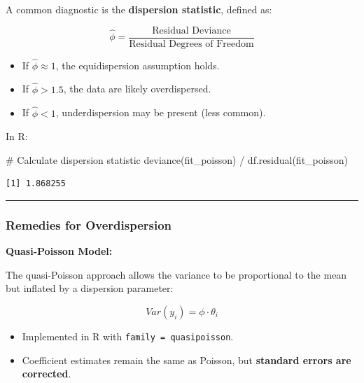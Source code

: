 \documentclass[
  letterpaper,
  DIV=11,
  numbers=noendperiod]{scrreprt}
\newenvironment{Shaded}{\begin{snugshade}}{\end{snugshade}}
\newcommand{\CommentTok}[1]{\textcolor[rgb]{0.37,0.37,0.37}{#1}}
\newcommand{\FunctionTok}[1]{\textcolor[rgb]{0.28,0.35,0.67}{#1}}
\newcommand{\NormalTok}[1]{\textcolor[rgb]{0.00,0.23,0.31}{#1}}
\newcommand{\SpecialCharTok}[1]{\textcolor[rgb]{0.37,0.37,0.37}{#1}}
\providecommand{\tightlist}{%
  \setlength{\itemsep}{0pt}\setlength{\parskip}{0pt}}\usepackage{longtable,booktabs,array}
\begin{document}
A common diagnostic is the \textbf{dispersion statistic}, defined as:

\[
\hat{\phi} = \frac{\text{Residual Deviance}}{\text{Residual Degrees of Freedom}}
\]

\begin{itemize}
\tightlist
\item
  If \(\hat{\phi} \approx 1\), the equidispersion assumption holds.\\
\item
  If \(\hat{\phi} > 1.5\), the data are likely overdispersed.\\
\item
  If \(\hat{\phi} < 1\), underdispersion may be present (less common).
\end{itemize}

In R:

\begin{Shaded}
\begin{Highlighting}[]
\CommentTok{\# Calculate dispersion statistic}
\FunctionTok{deviance}\NormalTok{(fit\_poisson) }\SpecialCharTok{/} \FunctionTok{df.residual}\NormalTok{(fit\_poisson)}
\end{Highlighting}
\end{Shaded}

\begin{verbatim}
[1] 1.868255
\end{verbatim}

\begin{center}\rule{0.5\linewidth}{0.5pt}\end{center}

\hypertarget{remedies-for-overdispersion}{%
\subsubsection*{Remedies for
Overdispersion}\label{remedies-for-overdispersion}}

\textbf{Quasi-Poisson Model:}

The quasi-Poisson approach allows the variance to be proportional to the
mean but inflated by a dispersion parameter:

\[
Var(y_i) = \phi \cdot \theta_i
\]

\begin{itemize}
\tightlist
\item
  Implemented in R with \texttt{family\ =\ quasipoisson}.\\
\item
  Coefficient estimates remain the same as Poisson, but \textbf{standard
  errors are corrected}.
\end{itemize}
\end{document}
